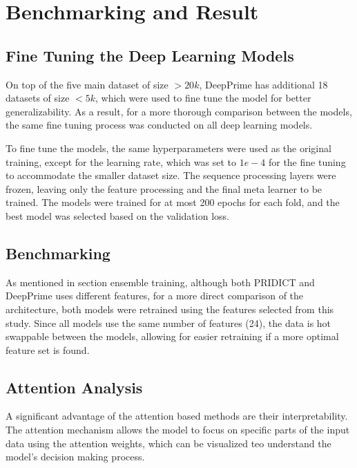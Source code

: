 \chapter{Benchmarking and Result}

\section{Fine Tuning the Deep Learning Models}

On top of the five main dataset of size $> 20k$, DeepPrime has additional 18 datasets of size $<5k$, which were used to fine tune the model for better generalizability. As a result, for a more thorough comparison between the models, the same fine tuning process was conducted on all deep learning models.

To fine tune the models, the same hyperparameters were used as the original training, except for the learning rate, which was set to $1e-4$ for the fine tuning to accommodate the smaller dataset size. The sequence processing layers were frozen, leaving only the feature processing and the final meta learner to be trained. The models were trained for at most 200 epochs for each fold, and the best model was selected based on the validation loss.

\section{Benchmarking}

As mentioned in section {ensemble training}, although both PRIDICT and DeepPrime uses different features, for a more direct comparison of the architecture, both models were retrained using the features selected from this study. Since all models use the same number of features (24), the data is hot swappable between the models, allowing for easier retraining if a more optimal feature set is found.

\section{Attention Analysis}
\label{sec:attention_analysis}

A significant advantage of the attention based methods are their interpretability. The attention mechanism allows the model to focus on specific parts of the input data using the attention weights, which can be visualized teo understand the model's decision making process. 

